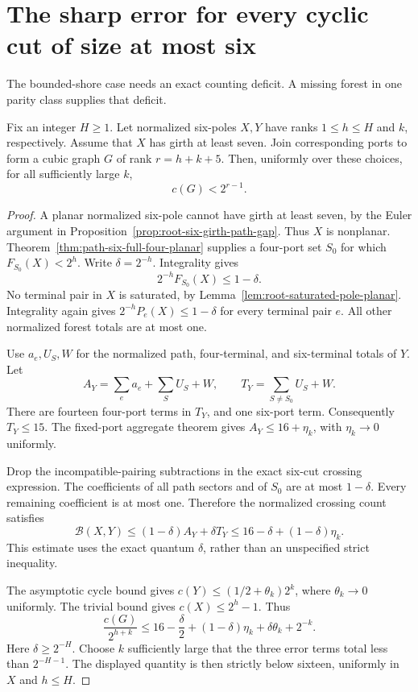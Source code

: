 \section{The sharp error for every cyclic cut of size at most six}
\label{sec:root-all-six-cuts}

The bounded-shore case needs an exact counting deficit.
A missing forest in one parity class supplies that deficit.

\begin{proposition}
\label{prop:root-bounded-six-shore}
Fix an integer $H\ge1$.
Let normalized six-poles $X,Y$ have ranks $1\le h\le H$ and $k$, respectively.
Assume that $X$ has girth at least seven.
Join corresponding ports to form a cubic graph $G$ of rank $r=h+k+5$.
Then, uniformly over these choices, for all sufficiently large $k$,
\[
 c(G)<2^{r-1}.
\]
\end{proposition}

\begin{proof}
A planar normalized six-pole cannot have girth at least seven, by the Euler argument in Proposition~\ref{prop:root-six-girth-path-gap}.
Thus $X$ is nonplanar.
Theorem~\ref{thm:path-six-full-four-planar} supplies a four-port set $S_0$ for which $F_{S_0}(X)<2^h$.
Write $\delta=2^{-h}$.
Integrality gives
\[
 2^{-h}F_{S_0}(X)\le1-\delta.
\]
No terminal pair in $X$ is saturated, by Lemma~\ref{lem:root-saturated-pole-planar}.
Integrality again gives $2^{-h}P_e(X)\le1-\delta$ for every terminal pair $e$.
All other normalized forest totals are at most one.

Use $a_e,U_S,W$ for the normalized path, four-terminal, and six-terminal totals of $Y$.
Let
\[
 A_Y=\sum_e a_e+\sum_SU_S+W,
 \qquad T_Y=\sum_{S\ne S_0}U_S+W.
\]
There are fourteen four-port terms in $T_Y$, and one six-port term.
Consequently $T_Y\le15$.
The fixed-port aggregate theorem gives $A_Y\le16+\eta_k$, with $\eta_k\to0$ uniformly.

Drop the incompatible-pairing subtractions in the exact six-cut crossing expression.
The coefficients of all path sectors and of $S_0$ are at most $1-\delta$.
Every remaining coefficient is at most one.
Therefore the normalized crossing count satisfies
\[
 \mathcal B(X,Y)
 \le(1-\delta)A_Y+\delta T_Y
 \le16-\delta+(1-\delta)\eta_k.
\]
This estimate uses the exact quantum $\delta$, rather than an unspecified strict inequality.

The asymptotic cycle bound gives $c(Y)\le(1/2+\theta_k)2^k$, where $\theta_k\to0$ uniformly.
The trivial bound gives $c(X)\le2^h-1$.
Thus
\[
 \frac{c(G)}{2^{h+k}}
 \le16-\frac\delta2+(1-\delta)\eta_k
       +\delta\theta_k+2^{-k}.
\]
Here $\delta\ge2^{-H}$.
Choose $k$ sufficiently large that the three error terms total less than $2^{-H-1}$.
The displayed quantity is then strictly below sixteen, uniformly in $X$ and $h\le H$.
\end{proof}

